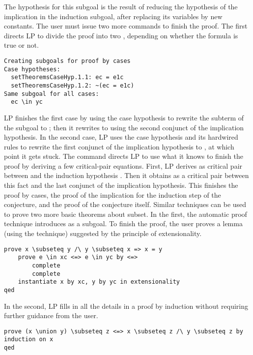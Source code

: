 The hypothesis for this subgoal is the result of reducing the hypothesis of the
implication in the induction subgoal, after replacing its variables by new
constants.
The user must issue two more commands to finish the proof.  The first directs
LP to divide the proof into two , depending on whether
the formula  is true or not.
\begin{verbatim}
Creating subgoals for proof by cases 
Case hypotheses:
  setTheoremsCaseHyp.1.1: ec = e1c
  setTheoremsCaseHyp.1.2: ~(ec = e1c)
Same subgoal for all cases:
  ec \in yc
\end{verbatim}
LP finishes the first case by using the case hypothesis to rewrite the subterm
 of the subgoal  to ; then it rewrites 
 to  using the second conjunct of the implication 
hypothesis.
\p
In the second case, LP uses the case hypothesis and its hardwired rules to
rewrite the first conjunct of the implication hypothesis to , at
which point it gets stuck.  The  command directs LP to use what
it knows to finish the proof by deriving a few critical-pair equations.  First,
LP derives  as critical pair between 
 and the induction hypothesis .  Then it obtains  
as a critical pair between this fact and the last conjunct of the implication
hypothesis.  This finishes the proof by cases, the proof of the implication for
the induction step of the conjecture, and the proof of the conjecture itself.
Similar techniques can be used to prove two more basic theorems about subset.
In the first, the automatic  proof technique
introduces  as a subgoal.  To finish the proof, the user proves a
lemma (using the  technique) suggested by the
principle of extensionality.
\begin{verbatim}
prove x \subseteq y /\ y \subseteq x => x = y
    prove e \in xc <=> e \in yc by <=>
        complete
        complete
    instantiate x by xc, y by yc in extensionality
qed
\end{verbatim}
In the second, LP fills in all the details in a proof by induction without
requiring further guidance from the user.
\begin{verbatim}
prove (x \union y) \subseteq z <=> x \subseteq z /\ y \subseteq z by induction on x
qed
\end{verbatim}

